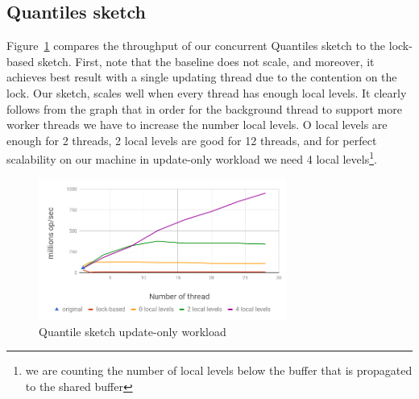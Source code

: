 


\subsection{Quantiles sketch}
\label{sub:quantilesExp}

Figure~\ref{fig:ConccurentQuantilesUpdate}  compares the
throughput of our concurrent Quantiles sketch to the lock-based sketch.
First, note that the baseline does not scale, and moreover, it
achieves best result with a single updating thread due to the contention on the lock.
Our sketch, scales well when every thread
has enough local levels.
It clearly follows from the graph that in order for the
background thread to support more worker threads we have to
increase the number local levels.
O local levels are enough for 2 threads, 2 local levels are good
for 12 threads, and for perfect scalability on our machine in
update-only workload we need 4 local levels\footnote{we are counting the number of local levels below the buffer that is propagated to the shared buffer}.

\begin{figure}[h]
  \centering
  \includegraphics*[width=3.2in]{images/QuantilesUpdate}
  \caption{Quantile sketch update-only workload}
   \label{fig:ConccurentQuantilesUpdate}
\end{figure}

